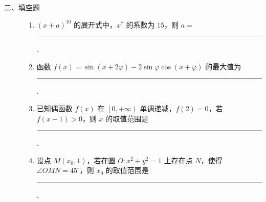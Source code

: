 \begin{description}

    \item[二、填空题]

    \begin{enumerate}[leftmargin=5pt]

      \addtocounter{enumi}{+12}

        \item \(\left(x+a\right)^{10}\) 的展开式中，\(x^7\) 的系数为 \(15\)，则 \(a=\)\rule[-0.3ex]{3em}{0.4pt}.

        \item 函数 \(f(x)=\sin\left(x+2\varphi\right)-2\sin\varphi\cos\left(x+\varphi\right)\) 的最大值为\rule[-0.3ex]{3em}{0.4pt}.

        \item 已知偶函数 \(f(x)\) 在 \(\left[0,+\infty\right)\) 单调递减，\(f(2)=0\)，若 \(f(x-1)>0\)，则 \(x\) 的取值范围是\rule[-0.3ex]{3em}{0.4pt}.

        \item 设点 \(M(x_0,1)\)，若在圆 \(O:x^2+y^2=1\) 上存在点 \(N\)，使得 \(\angle OMN=45^{\circ}\)，则 \(x_0\) 的取值范围是\rule[-0.3ex]{3em}{0.4pt}.

    \end{enumerate}

\end{description}

